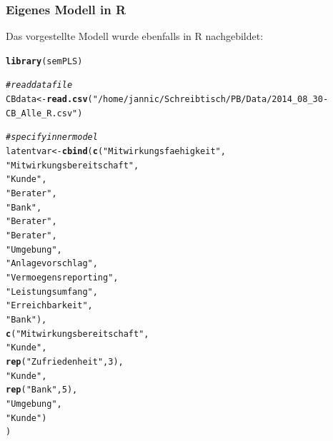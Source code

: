 \documentclass{article}\usepackage[]{graphicx}\usepackage[]{color}
\makeatletter
\newcommand{\hlnum}[1]{\textcolor[rgb]{0.686,0.059,0.569}{#1}}%
\newcommand{\hlstr}[1]{\textcolor[rgb]{0.192,0.494,0.8}{#1}}%
\newcommand{\hlcom}[1]{\textcolor[rgb]{0.678,0.584,0.686}{\textit{#1}}}%
\newcommand{\hlstd}[1]{\textcolor[rgb]{0.345,0.345,0.345}{#1}}%
\newcommand{\hlkwb}[1]{\textcolor[rgb]{0.69,0.353,0.396}{#1}}%
\newcommand{\hlkwd}[1]{\textcolor[rgb]{0.737,0.353,0.396}{\textbf{#1}}}%
\newenvironment{kframe}{%
 \def\at@end@of@kframe{}%
 \ifinner\ifhmode%
  \def\at@end@of@kframe{\end{minipage}}%
  \begin{minipage}{\columnwidth}%
 \fi\fi%
 \def\FrameCommand##1{\hskip\@totalleftmargin \hskip-\fboxsep
 \colorbox{shadecolor}{##1}\hskip-\fboxsep
     \hskip-\linewidth \hskip-\@totalleftmargin \hskip\columnwidth}%
 \MakeFramed {\advance\hsize-\width
   \@totalleftmargin\z@ \linewidth\hsize
   \@setminipage}}%
 {\par\unskip\endMakeFramed%
 \at@end@of@kframe}
\newenvironment{knitrout}{}{} %
\makeatother
\begin{document}
\subsubsection{Eigenes Modell in R}
Das vorgestellte Modell wurde ebenfalls in R nachgebildet:
\begin{knitrout}
\color{fgcolor}\begin{kframe}
\begin{alltt}
\hlkwd{library}\hlstd{(semPLS)}

\hlcom{#read data file}
\hlstd{CBdata} \hlkwb{<-} \hlkwd{read.csv}\hlstd{(}\hlstr{"/home/jannic/Schreibtisch/PB/Data/2014_08_30-CB_Alle_R.csv"}\hlstd{)}

\hlcom{#specify inner model}
\hlstd{latentvar} \hlkwb{<-} \hlkwd{cbind}\hlstd{(}\hlkwd{c}\hlstd{(}\hlstr{"Mitwirkungsfaehigkeit"}\hlstd{,}
                   \hlstr{"Mitwirkungsbereitschaft"}\hlstd{,}
                   \hlstr{"Kunde"}\hlstd{,}
                   \hlstr{"Berater"}\hlstd{,}
                   \hlstr{"Bank"}\hlstd{,}
                   \hlstr{"Berater"}\hlstd{,}
                   \hlstr{"Berater"}\hlstd{,}
                   \hlstr{"Umgebung"}\hlstd{,}
                   \hlstr{"Anlagevorschlag"}\hlstd{,}
                   \hlstr{"Vermoegensreporting"}\hlstd{,}
                   \hlstr{"Leistungsumfang"}\hlstd{,}
                   \hlstr{"Erreichbarkeit"}\hlstd{,}
                   \hlstr{"Bank"}\hlstd{),}
                    \hlkwd{c}\hlstd{(}\hlstr{"Mitwirkungsbereitschaft"}\hlstd{,}
                      \hlstr{"Kunde"}\hlstd{,}
                      \hlkwd{rep}\hlstd{(}\hlstr{"Zufriedenheit"}\hlstd{,}\hlnum{3}\hlstd{),}
                      \hlstr{"Kunde"}\hlstd{,}
                      \hlkwd{rep}\hlstd{(}\hlstr{"Bank"}\hlstd{,}\hlnum{5}\hlstd{),}
                      \hlstr{"Umgebung"}\hlstd{,}
                      \hlstr{"Kunde"}\hlstd{)}
                 \hlstd{)}


\end{alltt}
\end{kframe}
\end{knitrout}
\end{document}
